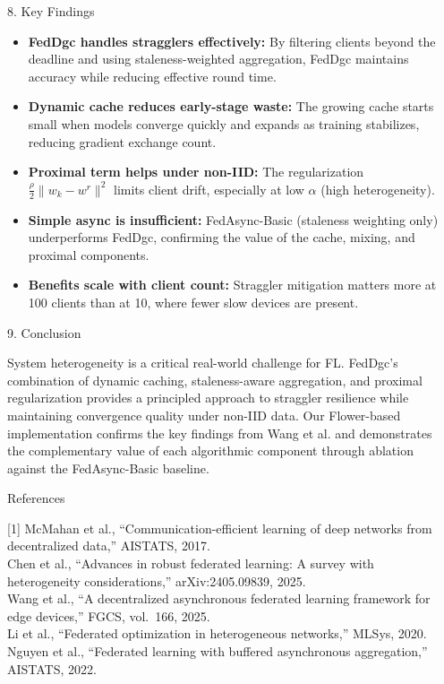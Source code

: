 \documentclass[final]{beamer}
\newlength{\sepwidth}
\newlength{\colwidth}
\newcommand{\separatorcolumn}{\begin{column}{\sepwidth}\end{column}}
\begin{document}
\begin{frame}[t]
\begin{columns}[t]
\begin{column}{\colwidth}
\begin{block}{8. Key Findings}
    \begin{itemize}
      \item \textbf{FedDgc handles stragglers effectively:} By filtering clients beyond the deadline and using staleness-weighted aggregation, FedDgc maintains accuracy while reducing effective round time.
      \item \textbf{Dynamic cache reduces early-stage waste:} The growing cache starts small when models converge quickly and expands as training stabilizes, reducing gradient exchange count.
      \item \textbf{Proximal term helps under non-IID:} The regularization $\frac{\rho}{2}\|w_k - w^r\|^2$ limits client drift, especially at low $\alpha$ (high heterogeneity).
      \item \textbf{Simple async is insufficient:} FedAsync-Basic (staleness weighting only) underperforms FedDgc, confirming the value of the cache, mixing, and proximal components.
      \item \textbf{Benefits scale with client count:} Straggler mitigation matters more at 100 clients than at 10, where fewer slow devices are present.
    \end{itemize}

  \end{block}

  \begin{block}{9. Conclusion}

    System heterogeneity is a critical real-world challenge for FL. FedDgc's combination of dynamic caching, staleness-aware aggregation, and proximal regularization provides a principled approach to straggler resilience while maintaining convergence quality under non-IID data. Our Flower-based implementation confirms the key findings from Wang et al. and demonstrates the complementary value of each algorithmic component through ablation against the FedAsync-Basic baseline.

  \end{block}

  \begin{block}{References}

    \footnotesize{
    [1] McMahan et al., ``Communication-efficient learning of deep networks from decentralized data,'' AISTATS, 2017.\\
    [2] Chen et al., ``Advances in robust federated learning: A survey with heterogeneity considerations,'' arXiv:2405.09839, 2025.\\
    [3] Wang et al., ``A decentralized asynchronous federated learning framework for edge devices,'' FGCS, vol.~166, 2025.\\
    [4] Li et al., ``Federated optimization in heterogeneous networks,'' MLSys, 2020.\\
    [5] Nguyen et al., ``Federated learning with buffered asynchronous aggregation,'' AISTATS, 2022.
    }

  \end{block}

\end{column}

\separatorcolumn
\end{columns}
\end{frame}
\end{document}
